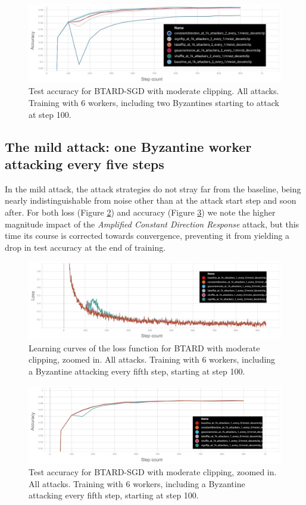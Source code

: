 \documentclass{article}
\begin{document}
\begin{figure}[h!]
\centering
\includegraphics[width=\textwidth]{figs/aggressive_attack_accuracy.jpeg}
\caption{Test accuracy for BTARD-SGD with moderate clipping. All attacks. Training with 6 workers, including two Byzantines starting to attack at step 100.}
\label{fig:test-acc}
\end{figure}

\subsection{The mild attack: one Byzantine worker attacking every five steps}
In the mild attack, the attack strategies do not stray far from the baseline, being nearly indistinguishable from noise other than at the attack start step and soon after. For both loss (Figure \ref{fig:learning-curve-mild}) and accuracy (Figure \ref{fig:test-acc-mild}) we note the higher magnitude impact of the \textit{Amplified Constant Direction Response} attack, but this time its course is corrected towards convergence, preventing it from yielding a drop in test accuracy at the end of training.
\begin{figure}[h!]
\centering
\includegraphics[width=\textwidth]{figs/mild_attack_loss_zoomed_in.jpg}
\caption{Learning curves of the loss function for BTARD with moderate clipping, zoomed in. All attacks. Training with 6 workers, including a Byzantine attacking every fifth step, starting at step 100.}
\label{fig:learning-curve-mild}
\end{figure}

\begin{figure}[h!]
\centering
\includegraphics[width=\textwidth]{figs/mild_attack_accuracy.jpg}
\caption{Test accuracy for BTARD-SGD with moderate clipping, zoomed in. All attacks. Training with 6 workers, including a Byzantine attacking every fifth step, starting at step 100.}
\label{fig:test-acc-mild}
\end{figure}
\end{document}
